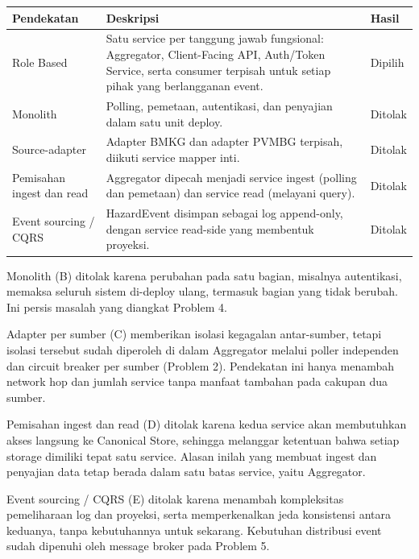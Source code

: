 \begin{longtable}[]{|>{\raggedright\arraybackslash}p{\dimexpr(\linewidth-6\tabcolsep)/3\relax}|>{\raggedright\arraybackslash}p{\dimexpr(\linewidth-6\tabcolsep)/3\relax}|>{\raggedright\arraybackslash}p{\dimexpr(\linewidth-6\tabcolsep)/3\relax}|}
\hline
Pendekatan & Deskripsi & Hasil \\
\hline
\endhead
\endlastfoot
Role Based & Satu service per tanggung jawab fungsional: Aggregator, Client-Facing API, Auth/Token Service, serta consumer terpisah untuk setiap pihak yang berlangganan event. & Dipilih \\
\hline
Monolith & Polling, pemetaan, autentikasi, dan penyajian dalam satu unit deploy. & Ditolak \\
\hline
Source-adapter & Adapter BMKG dan adapter PVMBG terpisah, diikuti service mapper inti. & Ditolak \\
\hline
Pemisahan ingest dan read & Aggregator dipecah menjadi service ingest (polling dan pemetaan) dan service read (melayani query). & Ditolak \\
\hline
Event sourcing / CQRS & HazardEvent disimpan sebagai log append-only, dengan service read-side yang membentuk proyeksi. & Ditolak \\
\hline
\end{longtable}

Monolith (B) ditolak karena perubahan pada satu bagian, misalnya autentikasi, memaksa seluruh sistem di-deploy ulang, termasuk bagian yang tidak berubah. Ini persis masalah yang diangkat Problem 4.

Adapter per sumber (C) memberikan isolasi kegagalan antar-sumber, tetapi isolasi tersebut sudah diperoleh di dalam Aggregator melalui poller independen dan circuit breaker per sumber (Problem 2). Pendekatan ini hanya menambah network hop dan jumlah service tanpa manfaat tambahan pada cakupan dua sumber.

Pemisahan ingest dan read (D) ditolak karena kedua service akan membutuhkan akses langsung ke Canonical Store, sehingga melanggar ketentuan bahwa setiap storage dimiliki tepat satu service. Alasan inilah yang membuat ingest dan penyajian data tetap berada dalam satu batas service, yaitu Aggregator.

Event sourcing / CQRS (E) ditolak karena menambah kompleksitas pemeliharaan log dan proyeksi, serta memperkenalkan jeda konsistensi antara keduanya, tanpa kebutuhannya untuk sekarang. Kebutuhan distribusi event sudah dipenuhi oleh message broker pada Problem 5.

